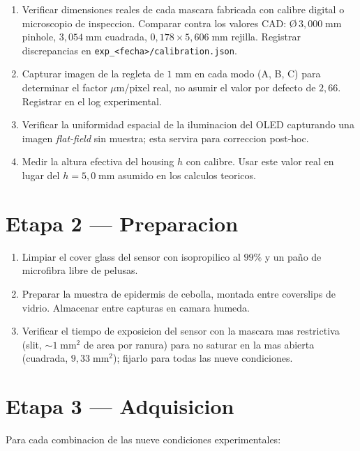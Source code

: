 \documentclass[11pt,a4paper,oneside]{report}
\begin{document}
\begin{enumerate}[leftmargin=2.2em]
  \item Verificar dimensiones reales de cada mascara fabricada con calibre
        digital o microscopio de inspeccion. Comparar contra los valores CAD:
        Ø$\,3{,}000\;\mathrm{mm}$ pinhole, $3{,}054\;\mathrm{mm}$ cuadrada,
        $0{,}178 \times 5{,}606\;\mathrm{mm}$ rejilla. Registrar discrepancias en
        \texttt{exp\_<fecha>/calibration.json}.
  \item Capturar imagen de la regleta de $1$ mm en cada modo (A, B, C)
        para determinar el factor $\mu$m/pixel real, no asumir el valor
        por defecto de $2{,}66$. Registrar en el log experimental.
  \item Verificar la uniformidad espacial de la iluminacion del OLED
        capturando una imagen \emph{flat-field} sin muestra; esta servira
        para correccion post-hoc.
  \item Medir la altura efectiva del housing $h$ con calibre. Usar este
        valor real en lugar del $h = 5{,}0\;\mathrm{mm}$ asumido en los
        calculos teoricos.
\end{enumerate}

\section{Etapa 2 --- Preparacion}

\begin{enumerate}[leftmargin=2.2em]
  \item Limpiar el cover glass del sensor con isopropilico al $99\%$ y
        un paño de microfibra libre de pelusas.
  \item Preparar la muestra de epidermis de cebolla, montada entre
        coverslips de vidrio. Almacenar entre capturas en camara humeda.
  \item Verificar el tiempo de exposicion del sensor con la mascara mas
        restrictiva (slit, $\sim 1\;\mathrm{mm}^2$ de area por ranura) para
        no saturar en la mas abierta (cuadrada, $9{,}33\;\mathrm{mm}^2$);
        fijarlo para todas las nueve condiciones.
\end{enumerate}

\section{Etapa 3 --- Adquisicion}

Para cada combinacion de las nueve condiciones experimentales:
\end{document}
